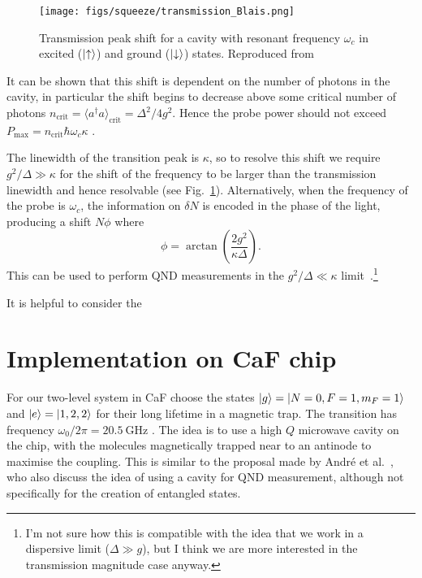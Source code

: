 \documentclass{article}
\begin{document}
\begin{figure}
  \centering
  \texttt{[image: figs/squeeze/transmission\_Blais.png]}
  \caption{Transmission peak shift for a cavity with resonant frequency
  $\omega_c$ in excited ($\ket{\uparrow}$) and ground ($\ket{\downarrow}$)
  states.  Reproduced from~\cite{PhysRevA.69.062320}}
  \label{transmission}
\end{figure}

It can be shown that this shift is dependent on the number of photons in the
cavity, in particular the shift begins to decrease above some critical number
of photons $n_\text{crit} = \langle a^\dagger a\rangle_\text{crit} = \Delta^2/4g^2$.
Hence the probe power should not exceed $P_\text{max} = n_\text{crit}\hbar
\omega_c \kappa$ \cite{PhysRevA.69.062320}.

The linewidth of the transition peak is $\kappa$, so to resolve this shift we
require $g^2/ \Delta \gg \kappa$ for the shift of the frequency to be larger
than the transmission linewidth and hence resolvable (see
Fig.~\ref{transmission}). Alternatively, when the frequency of the probe is
$\omega_c$, the information on $\delta N$ is encoded in the phase of the light,
producing a shift $N\phi$ where
%
\begin{equation}
  \phi = \arctan \left(\frac{2g^2}{\kappa \Delta}\right).
\end{equation}
%
This can be used to perform QND measurements in the $g^2/ \Delta \ll
\kappa$ limit~\cite{PhysRevA.69.062320}.\footnote{I'm not sure how this is
compatible with the idea that we work in a dispersive limit ($\Delta \gg g$),
but I think we are more interested in the transmission magnitude case anyway.}


It is helpful to consider the 

\section{Implementation on CaF chip}

For our two-level system in CaF choose the states $\ket{g} = \ket{N=0, F=1,
m_F=1}$ and $\ket{e} = \ket{1, 2, 2}$ for their long lifetime in a magnetic
trap. The transition has frequency $\omega_0/2\pi = \SI{20.5}{\giga\hertz}$
\cite{Williams2018}. The idea is to use a high $Q$ microwave cavity on the
chip, with the molecules magnetically trapped near to an antinode to maximise
the coupling. This is similar to the proposal made by Andr\'e et
al.~\cite{Andre2006}, who also discuss the idea of using a cavity for QND
measurement, although not specifically for the creation of entangled states.
\end{document}

